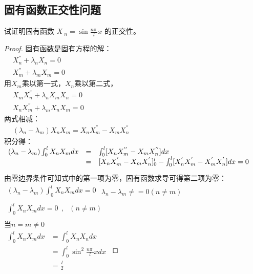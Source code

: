 \subsection{固有函数正交性问题}
\begin{example} %
试证明固有函数  $\displaystyle  X~_n= \sin \frac{n\pi~}{l} x  $ 的正交性。
\begin{proof} 
固有函数是固有方程的解：\\
 $\begin{array}{llll}
	&X_n ^{''}+\lambda_n X_n=0\\
	&X_m ^{''}+\lambda_m X_m=0
\end{array}$ \\ 
用$X_m$乘以第一式，$X_n$乘以第二式，\\
 $\begin{array}{llll}
	&X_m X_n ^{''}+\lambda_n X_m X_n=0\\
	&X_nX_m ^{''}+\lambda_m X_n X_m=0
\end{array}$ \\ 
两式相减：\\
 $\begin{array}{llll}
  & (\lambda_n-\lambda_m) X_n X_m= X_nX_m ^{''}-X_mX_n ^{''} 
\end{array}$ \\ 
积分得：\\
  $ \begin{array}{llll}
	(\lambda_n-\lambda_m) \int_{0 }^{l}  X_n X_m dx &= & \int_{0 }^{l}  [X_nX_m ^{''}-X_mX_n ^{''} ] dx\\   \vspace{0.3cm}
	&=&  [X_nX_m ^{'}-X_mX_n ^{'} ]_0 ^{l} - \int_{0 }^{l}  [X_n ^{'} X_m ^{'}-X_m ^{'} X_n ^{'} ] dx =0 \\   
\end{array}$ \\
 由零边界条件可知式中的第一项为零，固有函数求导可得第二项为零：\\
   $ \begin{array}{llll}
 	(\lambda_n-\lambda_m) \int_{0 }^{l}  X_n X_m dx=0 \\   
 \end{array}$ 
$ \lambda_n-\lambda_m\ne=0 (n\ne m)$\\
   $ \begin{array}{llll}
 \int_{0 }^{l}  X_n X_m dx=0 ~~,~~~ (n\ne m)\\   
\end{array}$ \\

当$n= m \ne 0$ \\   
 $ \begin{array}{llll}
	\int_{0 }^{l}  X_n X_m dx&= \int_{0 }^{l}  X_n X_n dx \\
	&= \int_{0 }^{l}   \sin ^2  \frac{n\pi~}{l} x dx \\
	&=  \frac{l}{2}  
\end{array}$ 
\end{proof}
\end{example}

